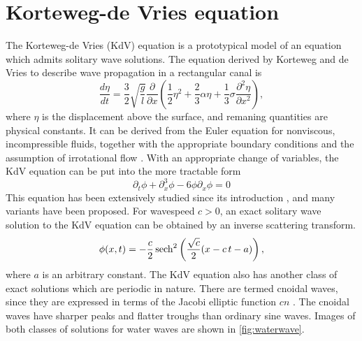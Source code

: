 \documentclass[thesis2.tex]{subfiles}
\begin{document}
\section{Korteweg-de Vries equation}

The Korteweg-de Vries (KdV) equation is a prototypical model of an equation which admits solitary wave solutions. The equation derived by Korteweg and de Vries \cite{KdVoriginal} to describe wave propagation in a rectangular canal is  
\[
\frac{d \eta}{dt} = \frac{3}{2} \sqrt{\frac{g}{l}}
\frac{\partial}{\partial x}
\left( \frac{1}{2} \eta^2 + \frac{2}{3} \alpha \eta + \frac{1}{3} \sigma \frac{\partial^2 \eta}{\partial x^2}\right),
\]
where $\eta$ is the displacement above the surface, and remaning quantities are physical constants. It can be derived from the Euler equation for nonviscous, incompressible fluids, together with the appropriate boundary conditions and the assumption of irrotational flow \cite{SolitonPhysics}. With an appropriate change of variables, the KdV equation can be put into the more tractable form
\begin{equation}\label{KdV3}
\partial_t \phi + \partial_x^3 \phi - 6 \phi \partial_x \phi = 0
\end{equation}
This equation has been extensively studied since its introduction \cite{miles1981,drazin1989solitons,SolitonPhysics}, and many variants have been proposed. For wavespeed $c > 0$, an exact solitary wave solution to the KdV equation can be obtained by an inverse scattering transform.
\[
\phi (x,t)=-{\frac {c}{2}}\,\mathrm {sech} ^{2}\left({{\sqrt {c}} \over 2}(x-c\,t-a)\right),
\]
where $a$ is an arbitrary constant. The KdV equation also has another class of exact solutions which are periodic in nature. There are termed cnoidal waves, since they are expressed in terms of the Jacobi elliptic function $cn$ \cite{drazin1989solitons}. The cnoidal waves have sharper peaks and flatter troughs than ordinary sine waves. Images of both classes of solutions for water waves are shown in \cref{fig:waterwave}.
\end{document}
